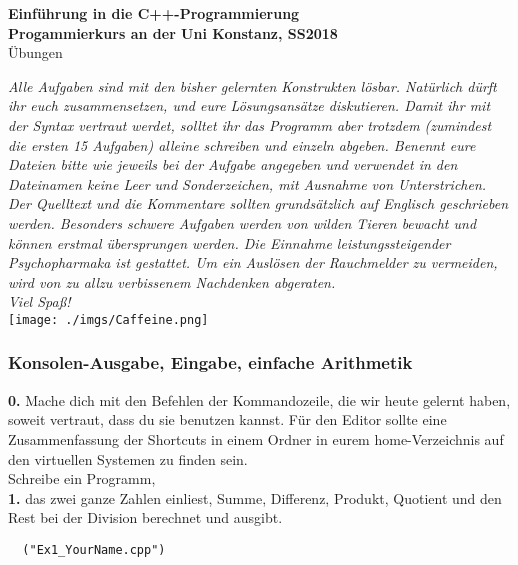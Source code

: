 \documentclass[paper=A4, pagesize, DIV=calc, smallheadings,
fontsize=11pt, expansion=false]{scrreprt}
\begin{document}
\pagestyle{empty}
\huge
\begin{center}
\textbf{Einführung in die C++-Programmierung}\\
\Large
\textbf{Progammierkurs an der Uni Konstanz, SS2018}\\
\large{Übungen}
\end{center}
\normalsize
\textit{Alle Aufgaben sind mit den bisher gelernten Konstrukten lösbar. Natürlich dürft ihr euch zusammensetzen, und eure Lösungsansätze diskutieren.
Damit ihr mit der Syntax vertraut werdet, solltet ihr das Programm aber trotzdem (zumindest die ersten 15 Aufgaben) alleine schreiben und einzeln abgeben.
Benennt eure Dateien bitte wie jeweils bei der Aufgabe angegeben und verwendet in den Dateinamen
keine Leer und Sonderzeichen, mit Ausnahme von Unterstrichen.
Der Quelltext und die Kommentare sollten grundsätzlich auf Englisch geschrieben werden. 
Besonders schwere Aufgaben werden von wilden Tieren bewacht und können erstmal übersprungen werden.
Die Einnahme leistungssteigender Psychopharmaka ist gestattet. Um ein Auslösen der Rauchmelder zu vermeiden, wird von zu allzu verbissenem Nachdenken abgeraten.\\
Viel Spaß!
}\\
\vspace{2em}\hspace*{30em}
\texttt{[image: ./imgs/Caffeine.png]}
\large
\normalsize
\subsubsection*{Konsolen-Ausgabe, Eingabe, einfache Arithmetik}
\textbf{0.} Mache dich mit den Befehlen der Kommandozeile, die wir heute gelernt haben, soweit vertraut, dass du sie benutzen kannst. Für den Editor sollte eine Zusammenfassung der Shortcuts in einem Ordner in eurem home-Verzeichnis auf den virtuellen Systemen zu finden sein.%
\vspace{.5em}
\\
Schreibe ein Programm,\\
\textbf{1.} das zwei ganze Zahlen einliest, Summe, Differenz, Produkt, Quotient und den Rest bei der Division berechnet und ausgibt.
\begin{verbatim}
  ("Ex1_YourName.cpp")
\end{verbatim}
\end{document}
